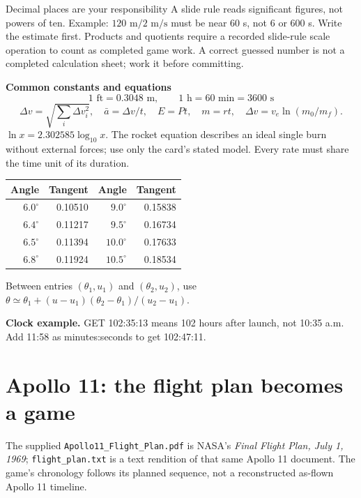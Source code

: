 \documentclass[11pt]{article}
\begin{document}
\begin{panel}{Decimal places are your responsibility}
A slide rule reads significant figures, not powers of ten.
Example: \(120\text{ m}/2\text{ m/s}\) must be near 60 s,
not 6 or 600 s. Write the estimate first.
Products and quotients require a recorded slide-rule scale operation
to count as completed game work. A correct guessed number is not a
completed calculation sheet; work it before committing.
\end{panel}

\textbf{Common constants and equations}
\[
1\text{ ft}=0.3048\text{ m},\qquad 1\text{ h}=60\text{ min}=3600\text{ s}
\]
\[
\Delta v=\sqrt{\sum_i\Delta v_i^2},\quad
\bar a=\Delta v/t,\quad E=Pt,\quad m=r t,\quad
\Delta v=v_e\ln(m_0/m_f).
\]
\(\ln x=2.302585\log_{10}x\). The rocket equation describes an ideal
single burn without external forces; use only the card's stated model.
Every rate must share the time unit of its duration.

\begin{center}
\begin{tabular}{@{}rrrr@{}}
\toprule
Angle & Tangent & Angle & Tangent\\
\midrule
\(6.0^\circ\) & 0.10510 & \(9.0^\circ\) & 0.15838\\
\(6.4^\circ\) & 0.11217 & \(9.5^\circ\) & 0.16734\\
\(6.5^\circ\) & 0.11394 & \(10.0^\circ\) & 0.17633\\
\(6.8^\circ\) & 0.11924 & \(10.5^\circ\) & 0.18534\\
\bottomrule
\end{tabular}
\end{center}
Between entries \((\theta_1,u_1)\) and \((\theta_2,u_2)\), use
\(\theta\simeq\theta_1+(u-u_1)(\theta_2-\theta_1)/(u_2-u_1)\).

\textbf{Clock example.} GET 102:35:13 means 102 hours after launch,
not 10:35 a.m. Add 11:58 as minutes:seconds to get 102:47:11.

\clearpage
\section*{Apollo 11: the flight plan becomes a game}
The supplied \texttt{Apollo11\_Flight\_Plan.pdf} is NASA's
\emph{Final Flight Plan, July 1, 1969}; \texttt{flight\_plan.txt}
is a text rendition of that same Apollo 11 document.
The game's chronology follows its planned sequence, not a reconstructed
as-flown Apollo 11 timeline.
\end{document}
